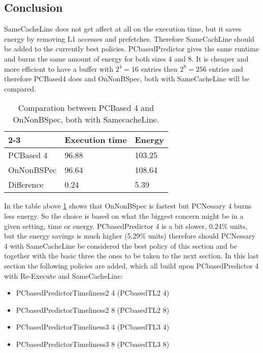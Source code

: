 \subsection{Conclusion}
SameCacheLine does not get affect at all on the execution time, but it saves energy
by removing L1 accesses and prefetches. Therefore SameCachLine should be added
to the currently best policies. PCbasedPredictor gives the same runtime and burns
the same amount of energy for both sizes 4 and 8. It is cheaper and more efficient
to have a buffer with $2^4=16$ entries then $2^8=256$ entries and therefore PCBased4
does and OnNonBSpec, both with SameCacheLine will be compared.

    \begin{table}[H]
\centering

\begin{tabular}{ |l|l|l| }
\cline{2-3}
\multicolumn{1}{ c| }{} 
& Execution time & Energy  \\  \hline
PCBased 4& 96.88 & 103.25  \\  \hline
OnNonBSPec & 96.64 & 108.64  \\  \hline
Difference & 0.24 & 5.39  \\  \hline
\end{tabular}
\caption{Comparation between PCBased 4 and OnNonBSpec, both with SamecacheLine. }
\label{quickcompPC4vsONBS}
\end{table}
In the table above \ref{quickcompPC4vsONBS} shows that OnNonBSpec is fastest but PCNessary 4 burns
less energy. So the choice is based on what the biggest concern might be in a given setting, time or energy. PCbasedPredictor 4 is a bit slower, 0.24\% units, but the energy
savings is much higher (5.29\% units) therefore should PCNessary 4 with SameCacheLine be considered the best policy of this section and be together with the basic three
the ones to be taken to the next section.
In this last section the following policies are added, which all build upon PCbasedPredictor 4 with Re-Execute and SameCacheLine:
\begin{itemize}
    \item PCbasedPredictorTimeliness2 4 (PCbasedTL2 4)
    \item PCbasedPredictorTimeliness2 8 (PCbasedTL2 8)
    \item PCbasedPredictorTimeliness3 4 (PCbasedTL3 4)
    \item PCbasedPredictorTimeliness3 8 (PCbasedTL3 8)
\end{itemize}
\resExtime


